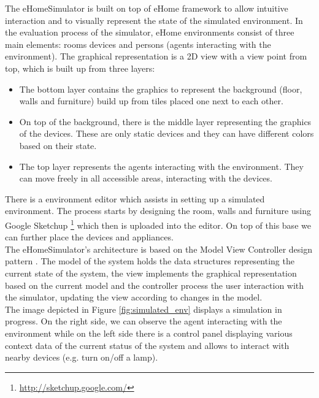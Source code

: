 The eHomeSimulator is built on top of eHome framework to allow intuitive interaction and to visually represent the state of the simulated environment. In the evaluation process of the simulator, eHome environments consist of three main elements: rooms devices and persons (agents interacting with the environment). The graphical representation is a 2D view with a view point from top, which is built up from three layers:
\begin{itemize}
	\item The bottom layer contains the graphics to represent the background (floor, walls and furniture) build up from tiles placed one next to each other.
	\item On top of the background, there is the middle layer representing the graphics of the devices. These are only static devices and they can have different colors based on their state.
	\item The top layer represents the agents interacting with the environment. They can move freely in all accessible areas, interacting with the devices.
\end{itemize}

There is a environment editor which assists in setting up a simulated environment. The process starts by designing the room, walls and furniture using Google Sketchup \footnote{\url{http://sketchup.google.com/}} which then is uploaded into the editor. On top of this base we can further place the devices and appliances.\\

The eHomeSimulator's architecture is based on the Model View Controller design pattern \cite{erich1995design}. The model of the system holds the data structures representing the current state of the system, the view implements the graphical representation based on the current model and the controller process the user interaction with the simulator, updating the view according to changes in the model.\\

The image depicted in Figure \ref{fig:simulated_env} displays a simulation in progress. On the right side, we can observe the agent interacting with the environment while on the left side there is a control panel displaying various context data of the current status of the system and allows to interact with nearby devices (e.g. turn on/off a lamp).


